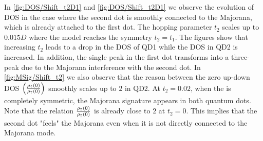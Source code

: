  In \ref{fig:DOS/Shift_t2D1} and \ref{fig:DOS/Shift_t2D1} we observe the evolution of DOS in the case where the second dot is smoothly connected to the Majorana, which is already attached to the first dot. The hopping parameter $t_2$ scales up to $0.015D$ where the model reaches the symmetry $t_2 = t_1$. The figures show that increasing $t_2$ leads to a drop in the DOS of QD1 while the DOS in QD2 is increased. In addition, the single peak in the first dot transforms into a three-peak due to the Majorana interference with the second dot. In \ref{fig:MSig/Shift_t2} we also observe that the reason between the zero up-down DOS  $\left(\frac{\rho_\uparrow(0)}{\rho_\uparrow(0)}\right)$ smoothly scales up to $2$ in QD2. At $t_2 =0.02$, when the  is completely symmetric, the Majorana signature appears in both quantum dots. Note that the relation $\frac{\rho_\uparrow(0)}{\rho_\uparrow(0)}$  is already close to $2$ at $t_2=0$. This implies that the second dot "feels" the Majorana even when it is not directly connected to the Majorana mode. 






